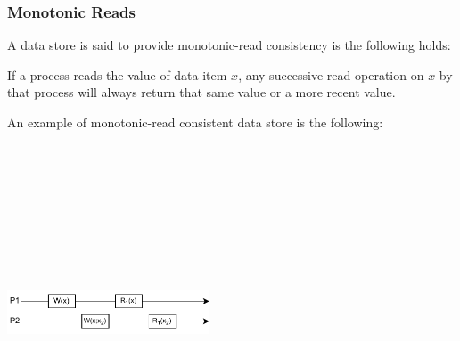 \documentclass{article}
\begin{document}
\subsubsection{Monotonic Reads}
A data store is said to provide monotonic-read consistency is the following holds:
\begin{changemargin}{0.4cm}{0cm} 
If a process reads the value of data item $x$, any successive read operation on $x$ by that process will always return that same value or a more recent value.
\end{changemargin}
An example of monotonic-read consistent data store is the following:
\begin{center}
	\includegraphics[width=6cm, height=10cm, keepaspectratio]{assets/monotonic-reads.pdf}
\end{center}
\end{document}
